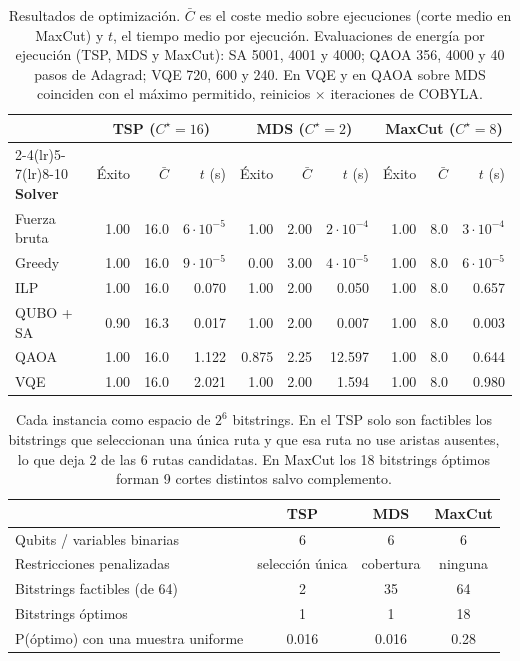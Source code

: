\begin{table}[!htbp]
\centering
\footnotesize
\setlength{\tabcolsep}{4pt}
\begin{tabular}{l rrr rrr rrr}
\toprule
& \multicolumn{3}{c}{\textbf{TSP} ($C^\star=16$)} & \multicolumn{3}{c}{\textbf{MDS} ($C^\star=2$)} & \multicolumn{3}{c}{\textbf{MaxCut} ($C^\star=8$)} \\
\cmidrule(lr){2-4}\cmidrule(lr){5-7}\cmidrule(lr){8-10}
\textbf{Solver} & Éxito & $\bar C$ & $t$ (s) & Éxito & $\bar C$ & $t$ (s) & Éxito & $\bar C$ & $t$ (s) \\
\midrule
Fuerza bruta & 1.00 & 16.0 & $6\cdot10^{-5}$ & 1.00 & 2.00 & $2\cdot10^{-4}$ & 1.00 & 8.0 & $3\cdot10^{-4}$ \\
Greedy & 1.00 & 16.0 & $9\cdot10^{-5}$ & 0.00 & 3.00 & $4\cdot10^{-5}$ & 1.00 & 8.0 & $6\cdot10^{-5}$ \\
ILP & 1.00 & 16.0 & 0.070 & 1.00 & 2.00 & 0.050 & 1.00 & 8.0 & 0.657 \\
QUBO + SA & 0.90 & 16.3 & 0.017 & 1.00 & 2.00 & 0.007 & 1.00 & 8.0 & 0.003 \\
QAOA & 1.00 & 16.0 & 1.122 & 0.875 & 2.25 & 12.597 & 1.00 & 8.0 & 0.644 \\
VQE & 1.00 & 16.0 & 2.021 & 1.00 & 2.00 & 1.594 & 1.00 & 8.0 & 0.980 \\
\bottomrule
\end{tabular}
\caption{Resultados de optimización. $\bar C$ es el coste medio sobre ejecuciones (corte medio en MaxCut) y $t$, el tiempo medio por ejecución. Evaluaciones de energía por ejecución (TSP, MDS y MaxCut): SA 5001, 4001 y 4000; QAOA 356, 4000 y 40 pasos de Adagrad; VQE 720, 600 y 240. En VQE y en QAOA sobre MDS coinciden con el máximo permitido, reinicios $\times$ iteraciones de COBYLA.}
\label{tab:res_opt}
\end{table}

\begin{table}[!htbp]
\centering
\small
\begin{tabular}{lccc}
\toprule
& \textbf{TSP} & \textbf{MDS} & \textbf{MaxCut} \\
\midrule
Qubits / variables binarias & 6 & 6 & 6 \\
Restricciones penalizadas & selección única & cobertura & ninguna \\
Bitstrings factibles (de 64) & 2 & 35 & 64 \\
Bitstrings óptimos & 1 & 1 & 18 \\
P(óptimo) con una muestra uniforme & 0.016 & 0.016 & 0.28 \\
\bottomrule
\end{tabular}
\caption{Cada instancia como espacio de $2^6$ bitstrings. En el TSP solo son factibles los bitstrings que seleccionan una única ruta y que esa ruta no use aristas ausentes, lo que deja 2 de las 6 rutas candidatas. En MaxCut los 18 bitstrings óptimos forman 9 cortes distintos salvo complemento.}
\label{tab:paisaje}
\end{table}

